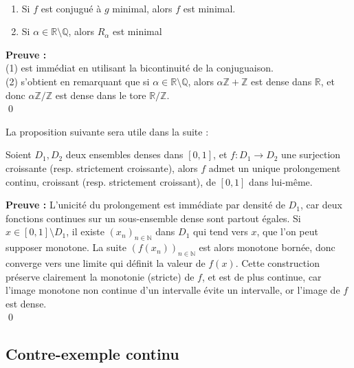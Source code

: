 \documentclass[11pt,a4paper]{article}
\begin{document}
\label{prop:mini}
\begin{proposition} ~ 
\begin{enumerate}
\item Si $f$ est conjugué à $g$ minimal, alors $f$ est minimal.
\item Si $\alpha \in \mathbb{R} \setminus \mathbb{Q}$, alors $R_\alpha$ est minimal
\end{enumerate}
\end{proposition}

\textbf{Preuve :} \\ 
(1) est immédiat en utilisant la bicontinuité de la conjuguaison. \\
(2) s'obtient en remarquant que si $\alpha \in \mathbb{R} \setminus \mathbb{Q}$, alors $\alpha\mathbb{Z} + \mathbb{Z}$ est dense dans $\mathbb{R}$, et donc $\alpha\mathbb{Z}/\mathbb{Z}$ est dense dans le tore $\mathbb{R}/\mathbb{Z}$. \\ \qed

La proposition suivante sera utile dans la suite :

\label{prop:dense}
\begin{proposition}
Soient $D_1,D_2$ deux ensembles denses dans $[0,1]$, et $f : D_1 \to D_2$ une surjection croissante (resp. strictement croissante), alors $f$ admet un unique prolongement continu, croissant (resp. strictement croissant), de $[0,1]$ dans lui-même.
\end{proposition}

\textbf{Preuve :} L'unicité du prolongement est immédiate par densité de $D_1$, car deux fonctions continues sur un sous-ensemble dense sont partout égales. Si $x\in [0,1]\setminus D_1$, il existe $(x_n)_{n\in \mathbb{N}}$ dans $D_1$ qui tend vers $x$, que l'on peut supposer monotone. La suite $(f(x_n))_{n\in\mathbb{N}}$ est alors monotone bornée, donc converge vers une limite qui définit la valeur de $f(x)$.
Cette construction préserve clairement la monotonie (stricte) de $f$, et est de plus continue, car l'image monotone non continue d'un intervalle évite un intervalle, or l'image de $f$ est dense. \\ \qed

\subsection{Contre-exemple continu} 
\end{document}
